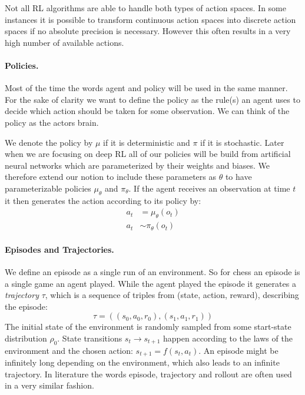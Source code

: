 Not all RL algorithms are able to handle both types of action spaces. In some instances it is possible to transform continuous action spaces into discrete action spaces if no absolute precision is necessary. However this often results in a very high number of available actions.

\paragraph{Policies.}
Most of the time the words agent and policy will be used in the same manner. For the sake of clarity we want to define the policy as the rule(s) an agent uses to decide which action should be taken for some observation. We can think of the policy as the actors brain.

We denote the policy by $\mu$ if it is deterministic and $\pi$ if it is stochastic. Later when we are focusing on deep RL all of our policies will be build from artificial neural networks which are parameterized by their weights and biases. We therefore extend our notion to include these parameters as $\theta$ to have parameterizable policies $\mu_\theta$ and $\pi_\theta$. If the agent receives an observation at time $t$ it then generates the action according to its policy by:
\begin{align*}
  a_t &= \mu_\theta(o_t) \\
  a_t &\sim \pi_\theta(o_t)
\end{align*}


\paragraph{Episodes and Trajectories.}
We define an episode as a single run of an environment. So for chess an episode is a single game an agent played. While the agent played the episode it generates a \textit{trajectory} $\tau$, which is a sequence of triples from (state, action, reward), describing the episode:
\[\tau = ((s_0, a_0, r_0),  (s_1, a_1, r_1)) \]
The initial state of the environment is randomly sampled from some start-state distribution $\rho_0$. State transitions $s_t \rightarrow s_{t+1}$ happen according to the laws of the environment and the chosen action: $s_{t+1} = f(s_t, a_t)$. An episode might be infinitely long depending on the environment, which also leads to an infinite trajectory. In literature the words episode, trajectory and rollout are often used in a very similar fashion. 


